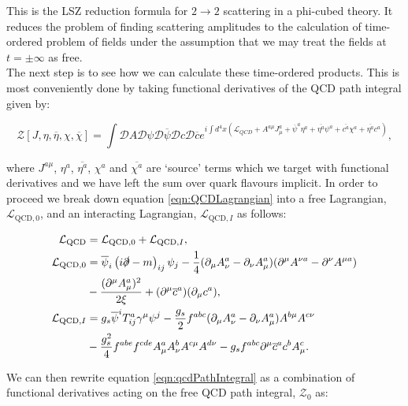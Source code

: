 	This is the LSZ reduction formula for $2\rightarrow2$ scattering in a phi-cubed theory.  It reduces the problem of finding scattering
	amplitudes to the calculation of time-ordered problem of fields under the assumption that we may treat the fields at $t=\pm\infty$
	as free.\\The next step is to see how we can calculate these time-ordered products. This is most conveniently done by taking
	functional derivatives of the QCD path integral given by:

	\begin{equation}
		\mathcal{Z}[J, \eta, \overline{\eta}, \chi, \overline{\chi}] = \int\mathcal{D}A\mathcal{D}\psi\mathcal{D}\overline{\psi}
		\mathcal{D}c\mathcal{D}\overline{c} e^{i\int d^4x(\mathcal{L}_{QCD} + A^{a\mu} J_\mu^a + \overline{\psi}^a\eta^a +
		\overline{\eta^a}\psi^a + \overline{c^a}\chi^a + \overline{\eta^a}c^a)},
		\label{eqn:qcdPathIntegral}
	\end{equation}

	where $J^{a\mu}$, $\eta^a$, $\overline{\eta^a}$, $\chi^a$ and $\overline{\chi^a}$ are `source' terms which we target with functional
	derivatives and we have left the sum over quark flavours implicit.  In order to proceed we break down equation \eqref{eqn:QCDLagrangian}
	into a free Lagrangian, $\mathcal{L}_{\text{QCD}, 0}$, and an interacting Lagrangian, $\mathcal{L}_{\text{QCD}, I}$ as follows:

	\begin{align*}
		\mathcal{L}_{\text{QCD}}    &= \mathcal{L}_{\text{QCD}, 0} + \mathcal{L}_{\text{QCD}, I},\\
		\mathcal{L}_{\text{QCD}, 0} &=  \overline{\psi}_i\left(i\slashed \partial-m\right)_{ij}\psi_j -
		\frac{1}{4}(\partial_{\mu}A_{\nu}^a - \partial_{\nu}A_{\mu}^a)(\partial^{\mu}A^{\nu a} - \partial^{\nu}A^{\mu a}) \\
		&-\frac{(\partial^\mu A_\mu^a)^2}{2\xi} + (\partial^\mu \overline{c}^{a})(\partial_\mu c^a),\\
		\mathcal{L}_{\text{QCD}, I} &= g_s\overline{\psi}^i T^a_{ij}\gamma^\mu\psi^j - \frac{g_s}{2}f^{abc}(\partial_{\mu}A^a_{\nu} -
		\partial_{\nu}A^a_{\mu})A^{b\mu}A^{c\nu} \\ &-\frac{g_s^2}{4}f^{abe}f^{cde}A^a_\mu A^b_\nu A^{c\mu}A^{d\nu} -
		g_sf^{abc}\partial^\mu \overline{c}^{a}c^bA^c_\mu.
	\end{align*}

	We can then rewrite equation \eqref{eqn:qcdPathIntegral} as a combination of functional derivatives acting on the free QCD path integral,
	$\mathcal{Z}_0$ as:

